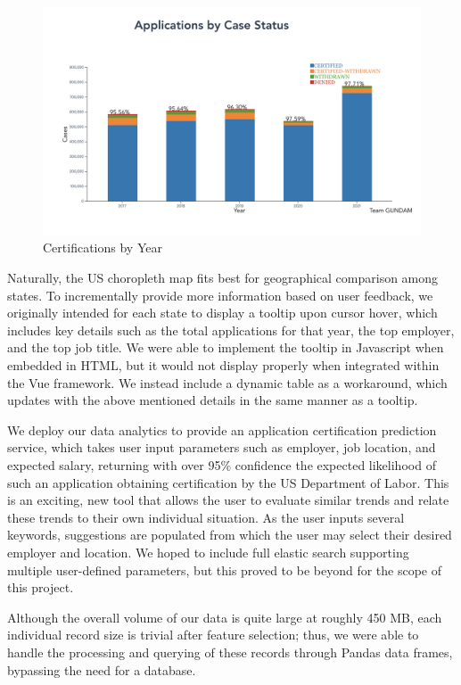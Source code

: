 \documentclass[sigconf]{acmart}
\begin{document}
\begin{figure}
  \includegraphics[width=\linewidth]{case_status_rate.png}
  \caption{Certifications by Year}
  \label{fig:casestatusrate}
\end{figure}

Naturally, the US choropleth map fits best for geographical comparison among states. To incrementally 
provide more information based on user feedback, we originally intended for each state to display a 
tooltip upon cursor hover, which includes key details such as the total applications for that year, the top employer, and the top 
job title. We were able to implement the tooltip in Javascript when embedded in HTML, but it would not display 
properly when integrated within the Vue framework. We instead include a dynamic table as a workaround, which updates with 
the above mentioned details in the same manner as a tooltip. 

We deploy our data analytics to provide an application certification prediction service, 
which takes user input parameters such as employer, job location, 
and expected salary, returning with over 95\% confidence the expected likelihood of 
such an application obtaining certification by the US Department of Labor. 
This is an exciting, new tool that allows the user to evaluate similar trends and relate these 
trends to their own individual situation. 
As the user inputs several keywords, suggestions are populated from which the user may select 
their desired employer and location. We hoped to include full elastic search supporting multiple 
user-defined parameters, but this proved to be beyond for the scope of this project. 

Although the overall volume of our data is quite large at roughly 450 MB, 
each individual record size is trivial after feature selection; thus, we 
were able to handle the processing and querying of these records through Pandas data frames, 
bypassing the need for a database. 
\end{document}
